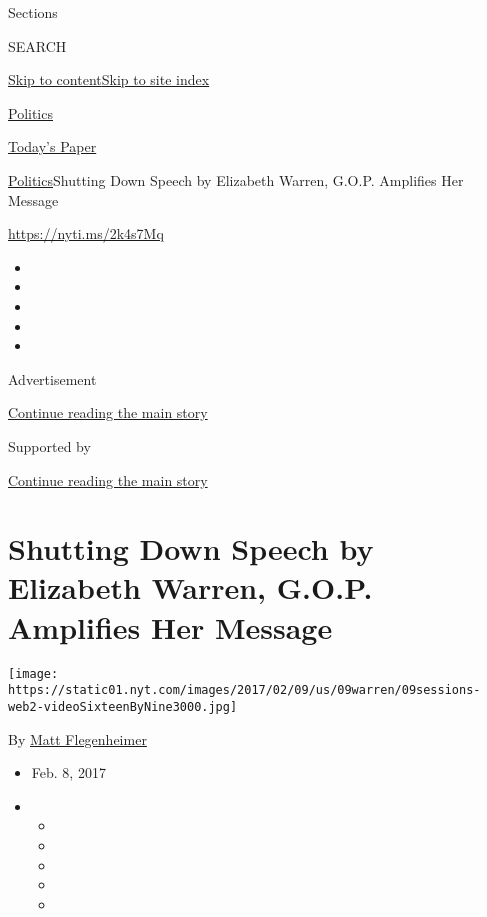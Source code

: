Sections

SEARCH

\protect\hyperlink{site-content}{Skip to
content}\protect\hyperlink{site-index}{Skip to site index}

\href{https://www.nytimes.com/section/politics}{Politics}

\href{https://myaccount.nytimes.com/auth/login?response_type=cookie\&client_id=vi}{}

\href{https://www.nytimes.com/section/todayspaper}{Today's Paper}

\href{/section/politics}{Politics}\textbar{}Shutting Down Speech by
Elizabeth Warren, G.O.P. Amplifies Her Message

\url{https://nyti.ms/2k4s7Mq}

\begin{itemize}
\item
\item
\item
\item
\item
\end{itemize}

Advertisement

\protect\hyperlink{after-top}{Continue reading the main story}

Supported by

\protect\hyperlink{after-sponsor}{Continue reading the main story}

\hypertarget{shutting-down-speech-by-elizabeth-warren-gop-amplifies-her-message}{%
\section{Shutting Down Speech by Elizabeth Warren, G.O.P. Amplifies Her
Message}\label{shutting-down-speech-by-elizabeth-warren-gop-amplifies-her-message}}

\texttt{[image: https://static01.nyt.com/images/2017/02/09/us/09warren/09sessions-web2-videoSixteenByNine3000.jpg]}

By \href{http://www.nytimes.com/by/matt-flegenheimer}{Matt Flegenheimer}

\begin{itemize}
\item
  Feb. 8, 2017
\item
  \begin{itemize}
  \item
  \item
  \item
  \item
  \item
  \end{itemize}
\end{itemize}

